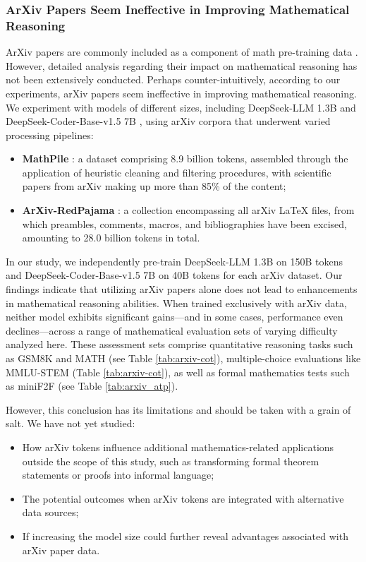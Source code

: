 \begin{itemize}[topsep=0pt]
\begin{itemize}[topsep=0pt]
\subsubsection{ArXiv Papers Seem Ineffective in Improving Mathematical Reasoning}

ArXiv papers are commonly included as a component of math pre-training data \citep{minerva,gpt-f,llemma,mathpile}. However, detailed analysis regarding their impact on mathematical reasoning has not been extensively conducted. Perhaps counter-intuitively, according to our experiments, arXiv papers seem ineffective in improving mathematical reasoning. We experiment with models of different sizes, including DeepSeek-LLM 1.3B and DeepSeek-Coder-Base-v1.5 7B \citep{deepseek-coder}, using arXiv corpora that underwent varied processing pipelines:

\begin{itemize}[topsep=0pt]
    \item \textbf{MathPile} \citep{mathpile}: a dataset comprising 8.9 billion tokens, assembled through the application of heuristic cleaning and filtering procedures, with scientific papers from arXiv making up more than 85\% of the content;
    \item \textbf{ArXiv-RedPajama} \citep{redpajama}: a collection encompassing all arXiv LaTeX files, from which preambles, comments, macros, and bibliographies have been excised, amounting to 28.0 billion tokens in total.
\end{itemize}

In our study, we independently pre-train DeepSeek-LLM 1.3B on 150B tokens and DeepSeek-Coder-Base-v1.5 7B on 40B tokens for each arXiv dataset. Our findings indicate that utilizing arXiv papers alone does not lead to enhancements in mathematical reasoning abilities. When trained exclusively with arXiv data, neither model exhibits significant gains—and in some cases, performance even declines—across a range of mathematical evaluation sets of varying difficulty analyzed here. These assessment sets comprise quantitative reasoning tasks such as GSM8K and MATH (see Table \ref{tab:arxiv-cot}), multiple-choice evaluations like MMLU-STEM (Table \ref{tab:arxiv-cot}), as well as formal mathematics tests such as miniF2F (see Table \ref{tab:arxiv_atp}).

However, this conclusion has its limitations and should be taken with a grain of salt. We have not yet studied:

\begin{itemize}[topsep=0pt]
    \item How arXiv tokens influence additional mathematics-related applications outside the scope of this study, such as transforming formal theorem statements or proofs into informal language;
    \item The potential outcomes when arXiv tokens are integrated with alternative data sources;
    \item If increasing the model size could further reveal advantages associated with arXiv paper data.
\end{itemize}


\end{itemize}
\end{itemize}
